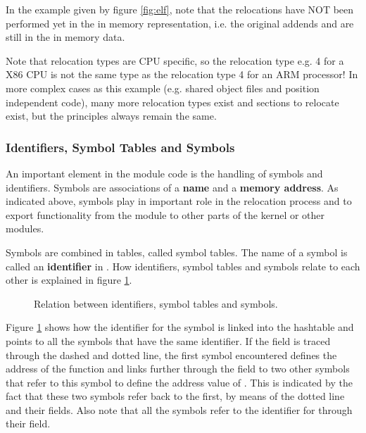 In the example given by figure \ref{fig:elf}, note that the relocations have
NOT been performed yet in the in memory representation, i.e. the original
addends  and  are still in the in memory
data.

Note that relocation types are CPU specific, so the relocation type e.g. 4 for a
X86 CPU is not the same type as the relocation type 4 for an ARM processor!
In more complex cases as this example (e.g. shared object files and position
independent code), many more relocation types exist and sections to relocate
exist, but the principles always remain the same.

\subsubsection{Identifiers, Symbol Tables and Symbols}

An important element in the module code is the handling of symbols and
identifiers. Symbols are associations of a \textbf{name} and a \textbf{memory
address}. As indicated above, symbols play in important role in the
relocation process and to export functionality from the module to other
parts of the kernel or other modules. 

Symbols are combined in tables, called symbol tables. The name of a symbol
is called an \textbf{identifier} in \oswald. How identifiers, symbol tables
and symbols relate to each other is explained in figure \ref{fig:symbols}.

\begin{figure}[!ht]
  \begin{center}
    \caption{Relation between identifiers, symbol tables and symbols.\label{fig:symbols}}
 \end{center}
\end{figure}

Figure \ref{fig:symbols} shows how the identifier for the  symbol is
linked into the hashtable and points to all the symbols that have the same
identifier. If the  field is traced
through the dashed and dotted line, the first symbol encountered defines the
address of the  function and links further through the
 field to two other symbols that refer to
this symbol to define the address value of . This is indicated by
the fact that these two symbols refer back to the first, by means of the
dotted line and their  fields.
Also note that all the symbols refer to the identifier for 
through their  field.

